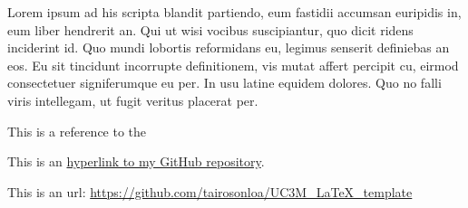 \documentclass[10pt, english, pdftex]{template/template}
\begin{document}
Lorem ipsum ad his scripta blandit partiendo, eum fastidii accumsan euripidis in, eum liber hendrerit an. Qui ut wisi vocibus suscipiantur,
quo dicit ridens inciderint id. Quo mundi lobortis reformidans eu, legimus senserit definiebas an eos. Eu sit tincidunt incorrupte definitionem,
vis mutat affert percipit cu, eirmod consectetuer signiferumque eu per. In usu latine equidem dolores. Quo no falli viris intellegam, ut fugit
veritus placerat per.

This is a reference to the 

This is an \href{https://github.com/tairosonloa/UC3M_LaTeX_template}{hyperlink to my GitHub repository}.

This is an url: \url{https://github.com/tairosonloa/UC3M_LaTeX_template}
\end{document}
